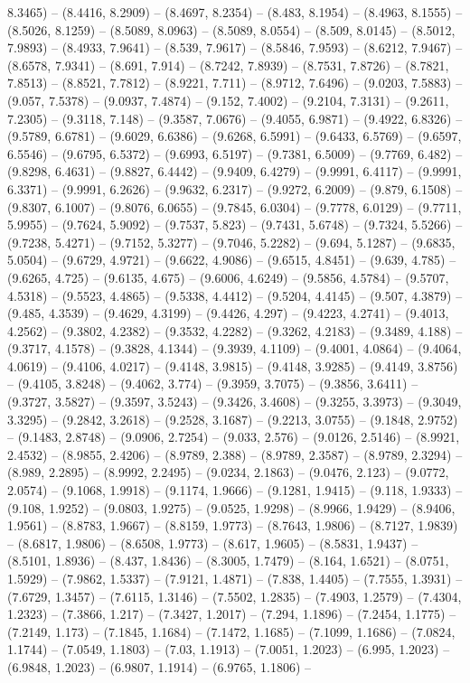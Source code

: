 8.3465) -- (8.4416, 8.2909) -- (8.4697, 8.2354) -- (8.483, 8.1954) -- (8.4963, 8.1555) -- (8.5026, 8.1259) -- (8.5089, 8.0963) -- (8.5089, 8.0554) -- (8.509, 8.0145) -- (8.5012, 7.9893) -- (8.4933, 7.9641) -- (8.539, 7.9617) -- (8.5846, 7.9593) -- (8.6212, 7.9467) -- (8.6578, 7.9341) -- (8.691, 7.914) -- (8.7242, 7.8939) -- (8.7531, 7.8726) -- (8.7821, 7.8513) -- (8.8521, 7.7812) -- (8.9221, 7.711) -- (8.9712, 7.6496) -- (9.0203, 7.5883) -- (9.057, 7.5378) -- (9.0937, 7.4874) -- (9.152, 7.4002) -- (9.2104, 7.3131) -- (9.2611, 7.2305) -- (9.3118, 7.148) -- (9.3587, 7.0676) -- (9.4055, 6.9871) -- (9.4922, 6.8326) -- (9.5789, 6.6781) -- (9.6029, 6.6386) -- (9.6268, 6.5991) -- (9.6433, 6.5769) -- (9.6597, 6.5546) -- (9.6795, 6.5372) -- (9.6993, 6.5197) -- (9.7381, 6.5009) -- (9.7769, 6.482) -- (9.8298, 6.4631) -- (9.8827, 6.4442) -- (9.9409, 6.4279) -- (9.9991, 6.4117) -- (9.9991, 6.3371) -- (9.9991, 6.2626) -- (9.9632, 6.2317) -- (9.9272, 6.2009) -- (9.879, 6.1508) -- (9.8307, 6.1007) -- (9.8076, 6.0655) -- (9.7845, 6.0304) -- (9.7778, 6.0129) -- (9.7711, 5.9955) -- (9.7624, 5.9092) -- (9.7537, 5.823) -- (9.7431, 5.6748) -- (9.7324, 5.5266) -- (9.7238, 5.4271) -- (9.7152, 5.3277) -- (9.7046, 5.2282) -- (9.694, 5.1287) -- (9.6835, 5.0504) -- (9.6729, 4.9721) -- (9.6622, 4.9086) -- (9.6515, 4.8451) -- (9.639, 4.785) -- (9.6265, 4.725) -- (9.6135, 4.675) -- (9.6006, 4.6249) -- (9.5856, 4.5784) -- (9.5707, 4.5318) -- (9.5523, 4.4865) -- (9.5338, 4.4412) -- (9.5204, 4.4145) -- (9.507, 4.3879) -- (9.485, 4.3539) -- (9.4629, 4.3199) -- (9.4426, 4.297) -- (9.4223, 4.2741) -- (9.4013, 4.2562) -- (9.3802, 4.2382) -- (9.3532, 4.2282) -- (9.3262, 4.2183) -- (9.3489, 4.188) -- (9.3717, 4.1578) -- (9.3828, 4.1344) -- (9.3939, 4.1109) -- (9.4001, 4.0864) -- (9.4064, 4.0619) -- (9.4106, 4.0217) -- (9.4148, 3.9815) -- (9.4148, 3.9285) -- (9.4149, 3.8756) -- (9.4105, 3.8248) -- (9.4062, 3.774) -- (9.3959, 3.7075) -- (9.3856, 3.6411) -- (9.3727, 3.5827) -- (9.3597, 3.5243) -- (9.3426, 3.4608) -- (9.3255, 3.3973) -- (9.3049, 3.3295) -- (9.2842, 3.2618) -- (9.2528, 3.1687) -- (9.2213, 3.0755) -- (9.1848, 2.9752) -- (9.1483, 2.8748) -- (9.0906, 2.7254) -- (9.033, 2.576) -- (9.0126, 2.5146) -- (8.9921, 2.4532) -- (8.9855, 2.4206) -- (8.9789, 2.388) -- (8.9789, 2.3587) -- (8.9789, 2.3294) -- (8.989, 2.2895) -- (8.9992, 2.2495) -- (9.0234, 2.1863) -- (9.0476, 2.123) -- (9.0772, 2.0574) -- (9.1068, 1.9918) -- (9.1174, 1.9666) -- (9.1281, 1.9415) -- (9.118, 1.9333) -- (9.108, 1.9252) -- (9.0803, 1.9275) -- (9.0525, 1.9298) -- (8.9966, 1.9429) -- (8.9406, 1.9561) -- (8.8783, 1.9667) -- (8.8159, 1.9773) -- (8.7643, 1.9806) -- (8.7127, 1.9839) -- (8.6817, 1.9806) -- (8.6508, 1.9773) -- (8.617, 1.9605) -- (8.5831, 1.9437) -- (8.5101, 1.8936) -- (8.437, 1.8436) -- (8.3005, 1.7479) -- (8.164, 1.6521) -- (8.0751, 1.5929) -- (7.9862, 1.5337) -- (7.9121, 1.4871) -- (7.838, 1.4405) -- (7.7555, 1.3931) -- (7.6729, 1.3457) -- (7.6115, 1.3146) -- (7.5502, 1.2835) -- (7.4903, 1.2579) -- (7.4304, 1.2323) -- (7.3866, 1.217) -- (7.3427, 1.2017) -- (7.294, 1.1896) -- (7.2454, 1.1775) -- (7.2149, 1.173) -- (7.1845, 1.1684) -- (7.1472, 1.1685) -- (7.1099, 1.1686) -- (7.0824, 1.1744) -- (7.0549, 1.1803) -- (7.03, 1.1913) -- (7.0051, 1.2023) -- (6.995, 1.2023) -- (6.9848, 1.2023) -- (6.9807, 1.1914) -- (6.9765, 1.1806) -- 